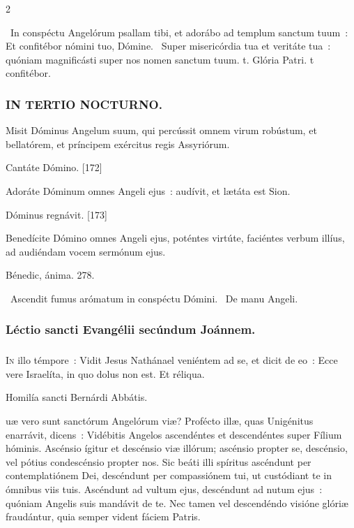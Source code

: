\documentclass[9pt,twoside]{extarticle}
\begin{document}
\begin{multicols}{2}
{\begin{tightlist}{}
\item {}~In conspéctu Angelórum psallam tibi, et adorábo ad templum sanctum tuum~: \textred{*} Et confitébor nómini tuo, Dómine. ~Super misericórdia tua et veritáte tua~: quóniam magnificásti super nos nomen sanctum tuum. t. Glória Patri. t confitébor.
\end{tightlist}

\subsubsection*{\center \textsc{IN TERTIO NOCTURNO.}}
\begin{tightlist}{}
\item {} Misit Dóminus Angelum suum, qui percússit omnem virum robústum, et bellatórem, et príncipem exércitus regis Assyriórum.
\item {} Cantáte Dómino. [172]
\item {} Adoráte Dóminum omnes Angeli ejus~: audívit, et lætáta est Sion.
\item {} Dóminus regnávit. [173]
\item {} Benedícite Dómino omnes Angeli ejus, poténtes virtúte, faciéntes verbum illíus, ad audiéndam vocem sermónum ejus.
\item {} Bénedic, ánima. 278.
\item {}~Ascendit fumus arómatum in conspéctu Dómini. ~De manu Angeli.
\end{tightlist}

\subsubsection*{\center Léctio sancti Evangélii secúndum Joánnem.}
\subsubsection*{\center {}}
\lettrine{I}n illo témpore~: Vidit Jesus Nathánael veniéntem ad se, et dicit de eo~: Ecce vere Israelíta, in quo dolus non est. Et réliqua.

\begin{center}Homilía sancti Bernárdi Abbátis.\\
\end{center}
uæ vero sunt sanctórum Angelórum viæ? Profécto illæ, quas Unigénitus enarrávit, dicens~: Vidébitis Angelos ascendéntes et descendéntes super Fílium hóminis. Ascénsio ígitur et descénsio viæ illórum; ascénsio propter se, descénsio, vel pótius condescénsio propter nos. Sic beáti illi spíritus ascéndunt per contemplatiónem Dei, descéndunt per compassiónem tui, ut custódiant te in ómnibus viis tuis. Ascéndunt ad vultum ejus, descéndunt ad nutum ejus~: quóniam Angelis suis mandávit de te. Nec tamen vel descendéndo visióne glóriæ fraudántur, quia semper vident fáciem Patris.

}
\end{multicols}
\end{document}
